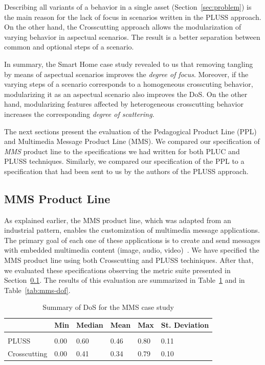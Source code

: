 \documentclass{acm_proc_article-sp}
\begin{document}
Describing all variants of a behavior in a single asset
(Section~\ref{sec:problem}) is the main reason for the lack of focus in scenarios
written in the PLUSS approach. On the other hand, the Crosscutting approach
allows the modularization of varying behavior in aspectual scenarios. The result
is a better separation between common and optional steps of a scenario. 

In summary, the Smart Home case study revealed to us that removing tangling by
means of aspectual scenarios improves the \emph{degree of focus}. Moreover, if
the varying steps of a scenario corresponds to a homogeneous crosscuting
behavior, modularizing it as an aspectual scenario also improves the DoS. On the
other hand, modularizing features affected by heterogeneous crosscutting
behavior increases the corresponding \emph{degree of scattering}.

The next sections present the evaluation of the Pedagogical Product Line (PPL)
and Multimedia Message Product Line (MMS). We compared our specification of
\emph{MMS} product line to the specifications we had written for both PLUC and
PLUSS techniques. Similarly, we compared our specification
of the PPL to a specification that had been sent to us by
the authors of the PLUSS approach. 
 
\subsection{MMS Product Line}

As explained earlier, the MMS product line, which was adapted from an industrial
pattern, enables the customization of multimedia message applications. The
primary goal of each one of these applications is to create and send messages
with embedded multimedia content (image, audio, video)~\cite{Bonifacio:2008aa}.
We have specified the MMS product line using both Crosscutting and PLUSS
techiniques. After that, we evaluated these specifications observing the metric
suite presented in Section~\ref{}. The results of this evaluation are summarized
in Table~\ref{tab:mms-dos} and in Table~\ref{tab:mms-dof}.

\begin{table}[htb] \centering
\caption{Summary of DoS for the MMS case study}
\label{tab:mms-dos}
\begin{small}
\begin{tabular}{llllll} \hline
					& Min 	& Median 	& Mean 	& Max 	& St. Deviation \\ \hline \\
	PLUSS			& 0.00  & 0.60   	& 0.46  & 0.80 	& 0.11 			\\
	Crosscutting	& 0.00  & 0.41   	& 0.34 	& 0.79 	& 0.10			\\ \hline	
\end{tabular}
\end{small}
\end{table}
\end{document}
